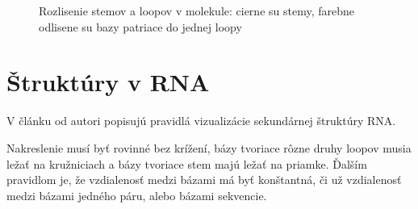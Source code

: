 \begin{figure}[H]
\centering
{}
\caption{Rozlisenie stemov a loopov v molekule: cierne su stemy, farebne odlisene su bazy patriace do jednej loopy}
\label{obr:RNA_motifs_stem_loop}
\end{figure}

\section{Štruktúry v RNA}

V článku od \citet{RNA_DRAW} autori popisujú pravidlá vizualizácie sekundárnej štruktúry RNA.

Nakreslenie musí byť rovinné bez krížení, bázy tvoriace rôzne druhy loopov musia ležať na kružniciach
a bázy tvoriace stem majú ležať na priamke.
Ďalším pravidlom je, že vzdialenosť medzi bázami má byť konštantná, či už vzdialenosť medzi bázami jedného páru,
alebo bázami sekvencie.

